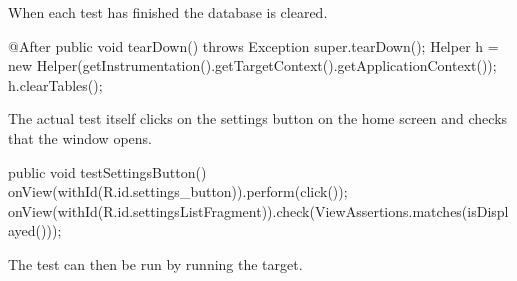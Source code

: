 When each test has finished the database is cleared.
\begin{javacode}
@After
public void tearDown() throws Exception {
    super.tearDown();
    Helper h = new Helper(getInstrumentation().getTargetContext().getApplicationContext());
    h.clearTables();
}
\end{javacode}

The actual test itself clicks on the settings button on the home screen and checks that the window opens.
\begin{javacode}[breakatwhitespace=false]
public void testSettingsButton() {
    onView(withId(R.id.settings_button)).perform(click());
    onView(withId(R.id.settingsListFragment)).check(ViewAssertions.matches(isDisplayed()));
}
\end{javacode}

The test can then be run by running the  target.